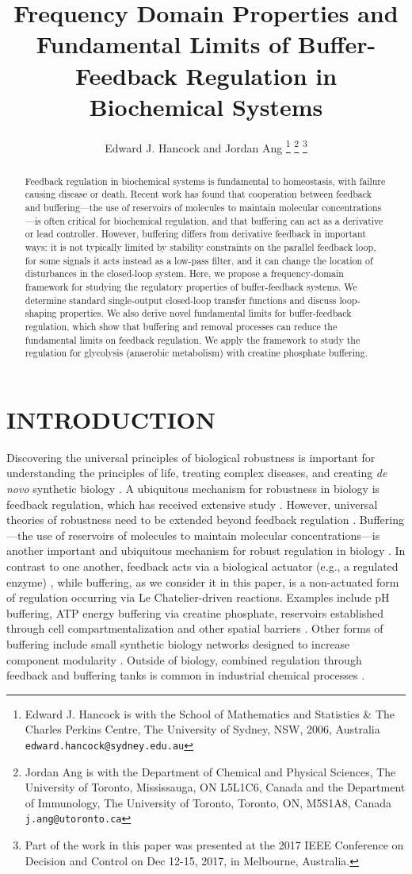 \documentclass[letterpaper, 10 pt,  conference]{ieeeconf}  %
\title{\LARGE \bf
Frequency Domain Properties and Fundamental Limits of Buffer-Feedback Regulation in Biochemical Systems}
\author{Edward J. Hancock and Jordan Ang%
\thanks{Edward J. Hancock is with the School of Mathematics and Statistics \& The Charles Perkins Centre,
        The University of Sydney, NSW, 2006, Australia
        {\tt\small edward.hancock@sydney.edu.au}}%
\thanks{Jordan Ang is with the Department of Chemical and Physical Sciences, The University of Toronto, Mississauga,
ON L5L1C6, Canada and the Department of Immunology, The University of Toronto,
Toronto, ON, M5S1A8, Canada {\tt\small j.ang@utoronto.ca}}%
\thanks{Part of the work in this paper was presented at the 2017 IEEE Conference on Decision and Control on Dec 12-15, 2017, in Melbourne, Australia.}
}
\begin{document}
\maketitle
\thispagestyle{empty}
\pagestyle{empty}%
\begin{abstract}

Feedback regulation in biochemical systems is fundamental to homeostasis, with failure causing disease or death. Recent work has found that cooperation between feedback and buffering---the use of reservoirs of molecules to maintain molecular concentrations---is often critical for biochemical regulation, and that buffering can act as a derivative or lead controller. However, buffering differs from derivative feedback in important ways: it is not typically limited by stability constraints on the parallel feedback loop, for some signals it acts instead as a low-pass filter, and it can change the location of disturbances in the closed-loop system. Here, we propose a frequency-domain framework for studying the regulatory properties of buffer-feedback systems. We determine standard single-output closed-loop transfer functions and discuss loop-shaping properties. We also derive novel fundamental limits for buffer-feedback regulation, which show that buffering and removal processes can reduce the fundamental limits on feedback regulation. We apply the framework to study the regulation for glycolysis (anaerobic metabolism) with creatine phosphate buffering. 
\end{abstract}


\section{INTRODUCTION}

Discovering the universal principles of biological robustness is important for understanding the principles of life, treating complex diseases, and creating \textit{de novo} synthetic biology \cite{KIT04}. A ubiquitous mechanism for robustness in biology is feedback regulation, which has received extensive study \cite{ALO07,CHABD11,IGLI09,KIT04,SAU17,YIHSD00}. However, universal theories of robustness need to be extended beyond feedback regulation \cite{KIT04}. Buffering---the use of reservoirs of molecules to maintain molecular concentrations---is another important and ubiquitous mechanism for robust regulation in biology \cite{HANAPS17,SHE13}. In contrast to one another, feedback acts via a biological actuator (e.g., a regulated enzyme) \cite{HANAPS17,SHE13}, while buffering, as we consider it in this paper, is a non-actuated form of regulation occurring via Le Chatelier-driven reactions. Examples include pH buffering, ATP energy buffering via creatine phosphate, reservoirs established through cell compartmentalization and other spatial barriers \cite{BERS10,HANAPS17,SHE13}. Other forms of buffering include small synthetic biology networks designed to increase component modularity \cite{VECNS08}. Outside of biology, combined regulation through feedback and buffering tanks is common in industrial chemical processes \cite{FAAS03}.
\end{document}
